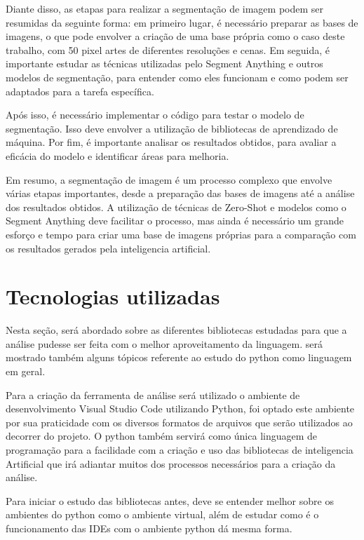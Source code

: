 Diante disso, as etapas para realizar a segmentação de imagem podem ser resumidas da seguinte forma: em primeiro lugar, é necessário preparar as bases de imagens, o que pode envolver a criação de uma base própria como o caso deste trabalho, com 50 pixel artes de diferentes resoluções e cenas. Em seguida, é importante estudar as técnicas utilizadas pelo Segment Anything e outros modelos de segmentação, para entender como eles funcionam e como podem ser adaptados para a tarefa específica.

Após isso, é necessário implementar o código para testar o modelo de segmentação. Isso deve envolver a utilização de bibliotecas de aprendizado de máquina. Por fim, é importante analisar os resultados obtidos, para avaliar a eficácia do modelo e identificar áreas para melhoria.

Em resumo, a segmentação de imagem é um processo complexo que envolve várias etapas importantes, desde a preparação das bases de imagens até a análise dos resultados obtidos. A utilização de técnicas de Zero-Shot e modelos como o Segment Anything deve facilitar o processo, mas ainda é necessário um grande esforço e tempo para criar uma base de imagens próprias para a comparação com os resultados gerados pela inteligencia artificial.


\section{Tecnologias utilizadas}
Nesta seção, será abordado sobre as diferentes bibliotecas estudadas para que a análise pudesse ser feita com o melhor aproveitamento da linguagem.
será mostrado também alguns tópicos referente ao estudo do python como linguagem em geral.

Para a criação da ferramenta de análise será utilizado o ambiente de desenvolvimento Visual Studio Code utilizando Python, foi optado este ambiente por sua praticidade com os diversos formatos de arquivos que serão utilizados ao decorrer do projeto. 
O python também servirá como única linguagem de programação para a facilidade com a criação e uso das bibliotecas de inteligencia Artificial que irá adiantar muitos dos processos necessários para a criação da análise.

Para iniciar o estudo das bibliotecas antes, deve se entender melhor sobre os ambientes do python como o ambiente virtual, além de estudar como é o funcionamento das IDEs com o ambiente python dá mesma forma.

